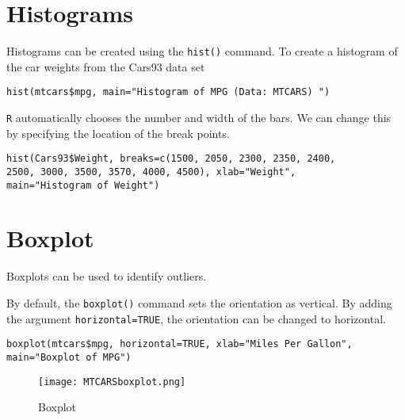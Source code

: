 \section{Histograms}
Histograms can be created using the \texttt{hist()} command.
To create a histogram of the car weights from the Cars93 data set
\footnotesize
\begin{myindentpar}{1cm}
\begin{verbatim}
hist(mtcars$mpg, main="Histogram of MPG (Data: MTCARS) ")
\end{verbatim}
\end{myindentpar}\normalsize
\texttt{R} automatically chooses the number and width of the bars. We can
change this by specifying the location of the break points.
\footnotesize
\begin{myindentpar}{1cm}
\begin{verbatim}hist(Cars93$Weight, breaks=c(1500, 2050, 2300, 2350, 2400,
2500, 3000, 3500, 3570, 4000, 4500), xlab="Weight",
main="Histogram of Weight")
\end{verbatim}
\end{myindentpar}\normalsize



\section{Boxplot}
Boxplots can be used to identify outliers.

By default, the \texttt{boxplot()} command sets the orientation as vertical. By adding the argument \texttt{horizontal=TRUE}, the orientation can be changed to horizontal.
\footnotesize
\begin{myindentpar}{1cm}
\begin{verbatim}
boxplot(mtcars$mpg, horizontal=TRUE, xlab="Miles Per Gallon",
main="Boxplot of MPG")
\end{verbatim}
\end{myindentpar}\normalsize

\begin{figure}
  \texttt{[image: MTCARSboxplot.png]}\\
  \caption{Boxplot}\label{boxplot}
\end{figure}


